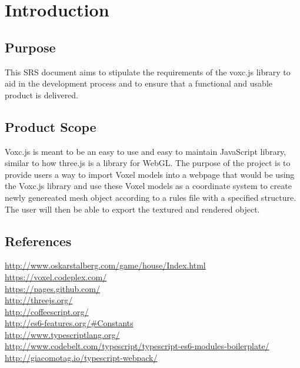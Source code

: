 \documentclass[english]{article}
\begin{document}
	\newpage
	\tableofcontents
	
	\newpage

	\section{Introduction}
	
		\subsection{Purpose}
		
		This SRS document aims to stipulate the requirements of the voxc.js library to aid in the development process and to ensure that a functional and usable product is delivered.
		
		\subsection{Product Scope}
		
		Voxc.js is meant to be an easy to use and easy to maintain JavaScript library, similar to how three.js is a library for WebGL. The purpose of the project is to provide users a way to import Voxel models into a webpage that would be using the Voxc.js library and use these Voxel models as a coordinate system to create newly genereated mesh object according to a rules file with a specified structure. The user will then be able to export the textured and rendered object.
		
		\subsection{References}
		
		\color{blue}
		\url{http://www.oskarstalberg.com/game/house/Index.html}
		\newline
		\\\url{https://voxel.codeplex.com/}
		\newline
		\\\url{https://pages.github.com/}
		\newline
		\\\url{http://threejs.org/}
		\newline
		\\\url{http://coffeescript.org/}
		\newline
		\\\url{http://es6-features.org/#Constants}
		\newline
		\\\url{http://www.typescriptlang.org/}
		\newline
		\\\url{http://www.codebelt.com/typescript/typescript-es6-modules-boilerplate/}
		\newline
		\\\url{http://giacomotag.io/typescript-webpack/}
		\color{black}
		
\end{document}
